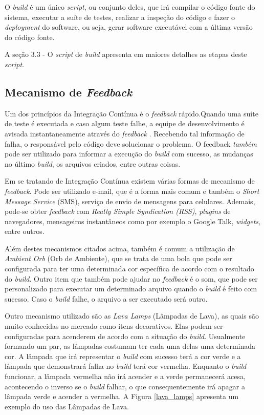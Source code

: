 O \textit{build} é um único \textit{script}, ou conjunto deles, que irá compilar o código fonte do sistema, executar a suíte de testes, realizar a inspeção do código e fazer o \textit{deployment} do software, ou seja, gerar software executável com a última versão do código fonte.

A seção 3.3 - O \textit{script} de \textit{build} apresenta em maiores detalhes as etapas deste \textit{script}.

\subsection{Mecanismo de \textit{Feedback}}

Um dos princípios da Integração Contínua é o \textit{feedback} rápido.Quando uma suíte de teste é executada e caso algum teste falhe, a equipe de desenvolvimento é avisada instantaneamente através do \textit{feedback} \cite{DUVALL}. Recebendo tal informação de falha, o responsável pelo código deve solucionar o problema. O feedback \textit{também} pode ser utilizado para informar a execução do \textit{build} com sucesso, as mudanças no último \textit{build}, os arquivos criados, entre outras coisas.

Em se tratando de Integração Contínua existem várias formas de mecanismo de \textit{feedback}. Pode ser utilizado e-mail, que é a forma mais comum e também o \textit{Short Message Service} (SMS), serviço de envio de mensagens para celulares. Ademais, pode-se obter \textit{feedback} com \textit{Really Simple Syndication (RSS)}, \textit{plugins} de navegadores, mensageiros instantâneos como por exemplo o Google Talk, \textit{widgets}, entre outros.

Além destes mecanismos citados acima, também é comum a utilização de \textit{Ambient Orb} (Orb de Ambiente), que se trata de uma bola que pode ser configurada para ter uma determinada cor específica de acordo com o resultado do \textit{build}. Outro item que também pode ajudar no \textit{feedback} é o som, que pode ser personalizado para executar um determinado arquivo quando o \textit{build} é feito com sucesso. Caso o \textit{build} falhe, o arquivo a ser executado será outro.

Outro mecanismo utilizado são as \textit{Lava Lamps} (Lâmpadas de Lava), as quais são muito conhecidas no mercado como itens decorativos. Elas podem ser configuradas para acenderem de acordo com a situação do \textit{build}. Usualmente formando um par, as lâmpadas costumam ter cada uma delas uma determinada cor. A lâmpada que irá representar o \textit{build} com sucesso terá a cor verde e a lâmpada que demonstrará falha no \textit{build} terá cor vermelha. Enquanto o \textit{build} funcionar, a lâmpada vermelha não irá acender e a verde permanecerá acesa, acontecendo o inverso se o \textit{build} falhar, o que consequentemente irá apagar a lâmpada verde e acender a vermelha. A Figura \ref{lava_lamps} apresenta um exemplo do uso das Lâmpadas de Lava.

